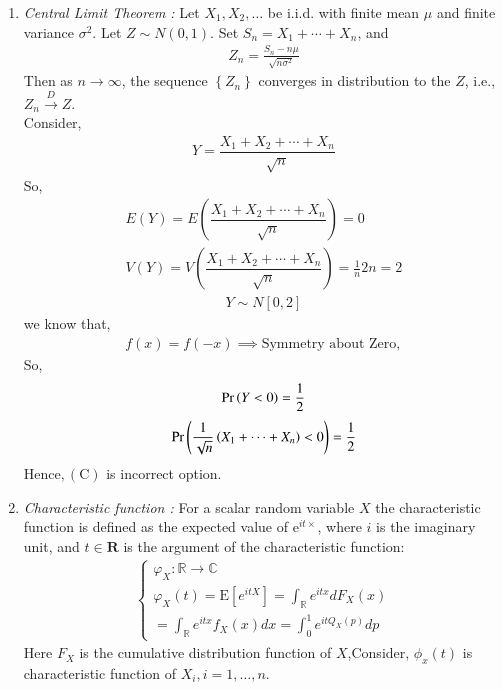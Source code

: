 \begin{enumerate}[label=\alph*)]
\item 
{\em Central Limit Theorem : }Let $X_{1}, X_{2}, \ldots$ be i.i.d. with finite mean $\mu$ and finite variance $\sigma^{2}$. Let $Z \sim N(0,1) .$ Set $S_{n}=X_{1}+\cdots+X_{n}$, and
\begin{align}
Z_{n}=\frac{S_{n}-n \mu}{\sqrt{n \sigma^{2}}}
\end{align}
Then as $n \rightarrow \infty$, the sequence $\left\{Z_{n}\right\}$ converges in distribution to the $Z$, i.e., $Z_{n} \stackrel{D}{\rightarrow} Z$.\\
Consider,
\begin{align}
Y=\dfrac{X_{1}+ X_{2}+ \cdots + X_n}{\sqrt{n}}
\end{align}
So,
\begin{align}
E(Y)= E\left(\dfrac{X_{1}+ X_{2}+ \cdots+X_n}{\sqrt{n}}\right)= 0\\
V(Y)= V\left(\dfrac{X_{1}+ X_{2}+ \cdots+X_n}{\sqrt{n}}\right)= \frac{1}{n}2n=2
\end{align}
\begin{align}
Y \sim N[0,2]
\end{align}
we know that,
\begin{align}
f(x)=f(-x)\implies \text{Symmetry about Zero},
\end{align}
So,
\begin{align}
\Pr\left(Y<0\right)=\frac{1}{2}
\end{align}
\begin{align}
\Pr\left(\dfrac{1}{\sqrt{n}}\left(X_{1}+\cdots+X_{n}\right)<0\right)=\frac{1}{2}
\end{align}
Hence$,(\mathrm{C})$ is incorrect option.
\item {\em Characteristic function : }For a scalar random variable $X$ the characteristic function is defined as the expected value of $\mathrm{e}^{i t \times}$, where $i$ is the imaginary unit, and $t \in \mathbf{R}$ is the argument of the characteristic function:
\begin{align}
\left\{\begin{array}{l}
\varphi_{X}: \mathbb{R} \rightarrow \mathbb{C} \\
\varphi_{X}(t)=\mathrm{E}\left[e^{i t X}\right]=\int_{\mathbb{R}} e^{i t x} d F_{X}(x)\\=\int_{\mathbb{R}} e^{i t x} f_{X}(x) d x=\int_{0}^{1} e^{i t Q_{X}(p)} d p
\end{array}\right.
\end{align}
Here $F_X$ is the cumulative distribution function of $X$,Consider, $\phi_{x}(t)$ is characteristic function of $X_{i}, i=1, \ldots, n.$

\end{enumerate}
